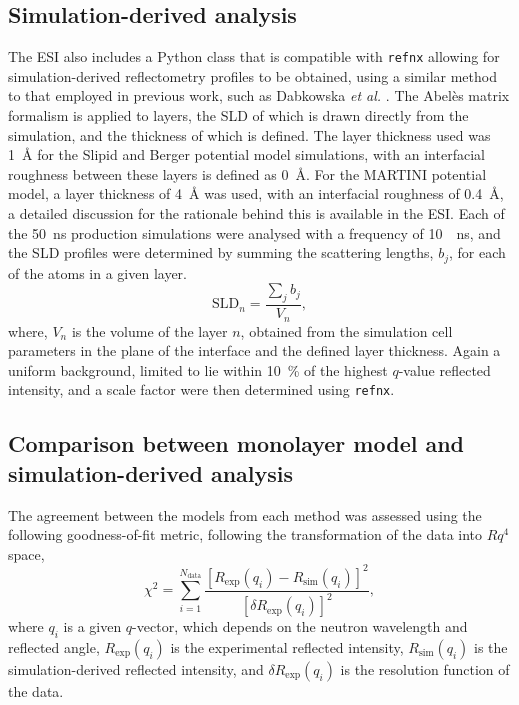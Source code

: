 \documentclass[amsmath,amssymb,twocolumn,superscriptaddress]{revtex4-1}
\begin{document}
\subsection{Simulation-derived analysis}
The ESI also includes a Python class that is compatible with \texttt{refnx} \cite{nelson_refnx_2019,nelson_refnx_2018} allowing for simulation-derived reflectometry profiles to be obtained, using a similar method to that employed in previous work, such as Dabkowska \emph{et al.} \cite{dabkowska_modulation_2014}.
The Abel\`{e}s matrix formalism is applied to layers, the SLD of which is drawn directly from the simulation, and the thickness of which is defined.
The layer thickness used was \SI{1}{\angstrom} for the Slipid and Berger potential model simulations, with an interfacial roughness between these layers is defined as \SI{0}{\angstrom}.
For the MARTINI potential model, a layer thickness of \SI{4}{\angstrom} was used, with an interfacial roughness of \SI{0.4}{\angstrom}, a detailed discussion for the rationale behind this is available in the ESI.
Each of the \SI{50}{\nano\second} production simulations were analysed with a frequency of \SI{10}{\per\nano\second}, and the SLD profiles were determined by summing the scattering lengths, $b_j$, for each of the atoms in a given layer.
%
\begin{equation}
  \text{SLD}_n = \frac{\sum_j{b_j}}{V_n},
\end{equation}
%
where, $V_n$ is the volume of the layer $n$, obtained from the simulation cell parameters in the plane of the interface and the defined layer thickness.
Again a uniform background, limited to lie within \SI{10}{\percent} of the highest $q$-value reflected intensity, and a scale factor were then determined using \texttt{refnx}.

\subsection{Comparison between monolayer model and simulation-derived analysis}
\label{sec:para}
The agreement between the models from each method was assessed using the following goodness-of-fit metric, following the transformation of the data into $Rq^4$ space,
%
\begin{equation}
  \chi^2 = \sum_{i=1}^{N_{\text{data}}} \frac{[R_{\text{exp}}(q_i) -
  R_{\text{sim}}(q_i)]^2}{[\delta R_{\text{exp}}(q_i)]^2},
\end{equation}
%
where $q_i$ is a given $q$-vector, which depends on the neutron wavelength and reflected angle, $R_{\text{exp}}(q_i)$ is the experimental reflected intensity, $R_{\text{sim}}(q_i)$ is the simulation-derived reflected intensity, and $\delta R_{\text{exp}}(q_i)$ is the resolution function of the data.
\end{document}
